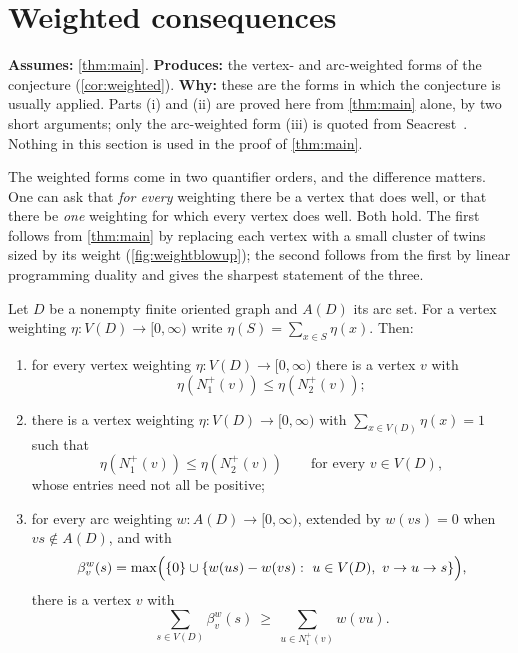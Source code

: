 \section{Weighted consequences}\label{sec:weighted}

\begin{contract}
\textbf{Assumes:} \cref{thm:main}. \quad
\textbf{Produces:} the vertex- and arc-weighted forms of the conjecture (\cref{cor:weighted}).
\textbf{Why:} these are the forms in which the conjecture is usually applied. Parts (i) and (ii) are
proved here from \cref{thm:main} alone, by two short arguments; only the arc-weighted form (iii) is
quoted from Seacrest~\cite{Seacrest2015}. Nothing in this section is used in the proof of
\cref{thm:main}.
\end{contract}

The weighted forms come in two quantifier orders, and the difference matters. One can ask that
\emph{for every} weighting there be a vertex that does well, or that there be \emph{one} weighting
for which every vertex does well. Both hold. The first follows from \cref{thm:main} by replacing
each vertex with a small cluster of twins sized by its weight (\cref{fig:weightblowup}); the second
follows from the first by linear programming duality and gives the sharpest statement of the three.

\begin{corollary}\label{cor:weighted}
Let $D$ be a nonempty finite oriented graph and $A(D)$ its arc set. For a vertex weighting
$\eta:V(D)\to[0,\infty)$ write $\eta(S)=\sum_{x\in S}\eta(x)$. Then:
\begin{enumerate}[label=\textup{(\roman*)},leftmargin=1.6em,itemsep=3pt]
\item for every vertex weighting $\eta:V(D)\to[0,\infty)$ there is a vertex $v$ with
  \[
   \eta(N_1^+(v))\le\eta(N_2^+(v));
  \]
\item there is a vertex weighting $\eta:V(D)\to[0,\infty)$ with $\sum_{x\in V(D)}\eta(x)=1$ such that
  \[
   \eta(N_1^+(v))\le\eta(N_2^+(v))\qquad\text{for every }v\in V(D),
  \]
  whose entries need not all be positive;
\item for every arc weighting $w:A(D)\to[0,\infty)$, extended by $w(vs)=0$ when $vs\notin A(D)$, and
  with
  \[
   \beta_v^w(s)=\max\Bigl(\{0\}\cup\{w(us)-w(vs):\ u\in V(D),\ v\to u\to s\}\Bigr),
  \]
  there is a vertex $v$ with
  \[
   \sum_{s\in V(D)}\beta_v^w(s)\ \ge\ \sum_{u\in N_1^+(v)}w(vu).
  \]
\end{enumerate}
\end{corollary}

